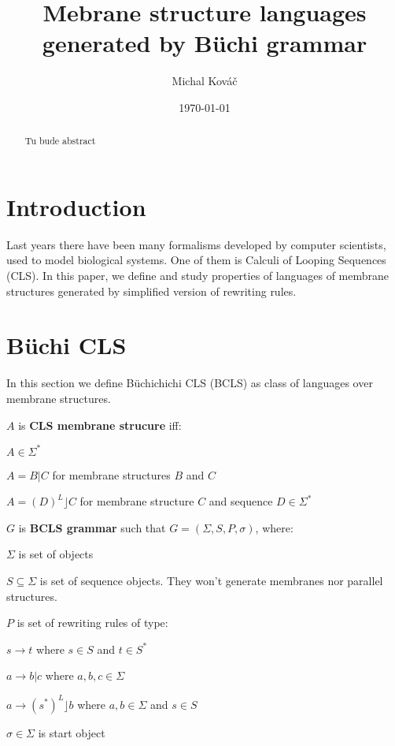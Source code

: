 \documentclass[a4paper,10pt]{article}
\newenvironment{itemize*}%
  {\begin{itemize}%
    \setlength{\itemsep}{0pt}%
    \setlength{\parskip}{0pt}}%
  {\end{itemize}}
\newenvironment{enumerate*}%
  {\begin{enumerate}%
    \setlength{\itemsep}{0pt}%
    \setlength{\parskip}{0pt}}%
  {\end{enumerate}}
\begin{document}
\title{Mebrane structure languages generated by Büchi grammar}
\author{Michal Kováč}
\date{\today}
\maketitle

\begin{abstract}
Tu bude abstract
\end{abstract}

\section{Introduction}
Last years there have been many formalisms developed by computer scientists, used to model biological systems. One of them is Calculi of Looping Sequences (CLS). In this paper, we define and study properties of languages of membrane structures generated by simplified version of rewriting rules.
\section{Büchi CLS}
In this section we define Büchichichi CLS (BCLS) as class of languages over membrane structures.
\begin{definicia}
  $A$ is {\bf CLS membrane strucure} iff:
  \begin{enumerate*}
    \item $A\in\Sigma^*$
    \item $A=B|C$ for membrane structures $B$ and $C$
    \item $A=(D)^L\rfloor C$ for membrane structure $C$ and sequence $D\in \Sigma^*$
  \end{enumerate*}
\end{definicia}

\begin{definicia}
  $G$ is {\bf BCLS grammar} such that $G=(\Sigma, S, P, \sigma)$, where:
  \begin{itemize*}
    \item $\Sigma$ is set of objects
    \item $S\subseteq\Sigma$ is set of sequence objects. They won't generate membranes nor parallel structures.
    \item $P$ is set of rewriting rules of type:
      \begin{itemize*}
        \item $s\rightarrow t$ where $s\in S$ and $t\in S^*$
        \item $a\rightarrow b|c$ where $a,b,c\in\Sigma$
        \item $a\rightarrow (s^*)^L\rfloor b$ where $a,b\in\Sigma$ and $s\in S$
      \end{itemize*}
    \item $\sigma\in\Sigma$ is start object
  \end{itemize*}
\end{definicia}
\end{document}
